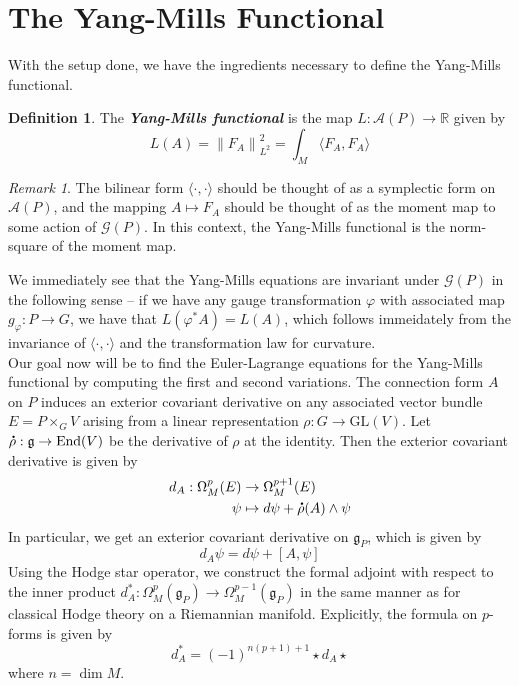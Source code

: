 \documentclass[psamsfonts, 12pt]{amsart}
\theoremstyle{definition}
\newtheorem{defn}[thm]{Definition}
\theoremstyle{remark}
\newtheorem*{rem*}{Remark}
\newcommand{\R}{\mathbb{R}}
\newcommand{\ib}[1]{\textbf{\textit{#1}}}
\newcommand{\GL}{\mathrm{GL}}
\newcommand{\g}{\mathfrak{g}}
\newcommand*{\dt}[1]{%
   \accentset{\mbox{\large\bfseries .}}{#1}}
\newcommand{\norm}[1]{\left\lVert#1\right\rVert}
\DeclareMathOperator{\End}{End}
\begin{document}
\section{The Yang-Mills Functional}
%
With the setup done, we have the ingredients necessary to define the Yang-Mills
functional.
%
\begin{defn}
The \ib{Yang-Mills functional} is the map
$L : \mathscr{A}(P) \to \R$ given by
\[
L(A) = \norm{F_A}_{L^2}^2 = \int_M \langle F_A,F_A \rangle
\]
\end{defn}
%
\begin{rem*}
The bilinear form $\langle \cdot,\cdot\rangle$ should be thought of as a symplectic
form on $\mathscr{A}(P)$, and the mapping $A \mapsto F_A$ should be thought of
as the moment map to some action of $\mathscr{G}(P)$. In this context, the
Yang-Mills functional is the norm-square of the moment map.
\end{rem*}
%
We immediately see that the Yang-Mills equations are invariant under $\mathscr{G}(P)$
in the following sense -- if we have any gauge transformation $\varphi$ with
associated map $g_\varphi : P \to G$, we have that $L(\varphi^*A) = L(A)$,
which follows immeidately from the invariance of $\langle\cdot,\cdot\rangle$
and the transformation law for curvature. \\

Our goal now will be to find the Euler-Lagrange
equations for the Yang-Mills functional by computing the first and second variations.
The connection form $A$ on $P$ induces an exterior covariant derivative on any
associated vector bundle $E = P \times_G V$ arising from a linear representation
$\rho : G \to \GL(V)$. Let $\dt{\rho} : \g \to \End(V)$ be the derivative of
$\rho$ at the identity. Then the exterior covariant derivative is given by
\begin{align*}
d_A : \Omega^p_M(E) &\to \Omega^{p+1}_M(E) \\
\psi &\mapsto d\psi + \dt{\rho}(A) \wedge \psi
\end{align*}
%
In particular, we get an exterior covariant derivative on $\g_P$, which is given by
\[
d_A\psi = d\psi + [A,\psi]
\]
Using the Hodge star operator, we construct the formal adjoint with respect to
the inner product $d_A^* : \Omega^{p}_M(\g_P) \to \Omega^{p-1}_M(\g_P)$ in the same manner
as for classical Hodge theory on a Riemannian manifold. Explicitly, the formula
on $p$-forms is given by
\[
d^*_A = (-1)^{n(p+1) + 1}\star d_A \star
\]
where $n = \dim M$. \\
\end{document}
